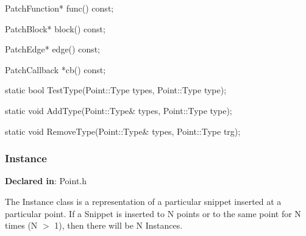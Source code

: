 
\begin{apient}
PatchFunction* func() const;
\end{apient}



\begin{apient}
PatchBlock* block() const;
\end{apient}



\begin{apient}
PatchEdge* edge() const;
\end{apient}



\begin{apient}
PatchCallback *cb() const;
\end{apient}



\begin{apient}
static bool TestType(Point::Type types, Point::Type type);
\end{apient}



\begin{apient}
static void AddType(Point::Type& types, Point::Type type);
\end{apient}



\begin{apient}
static void RemoveType(Point::Type& types, Point::Type trg);
\end{apient}



\subsubsection{Instance}
\label{sec-3.1.3}

\textbf{Declared in}: Point.h

The Instance class is a representation of a particular snippet inserted at a
particular point. If a Snippet is inserted to N points or to the same point for
N times (N $>$ 1), then there will be N Instances.


